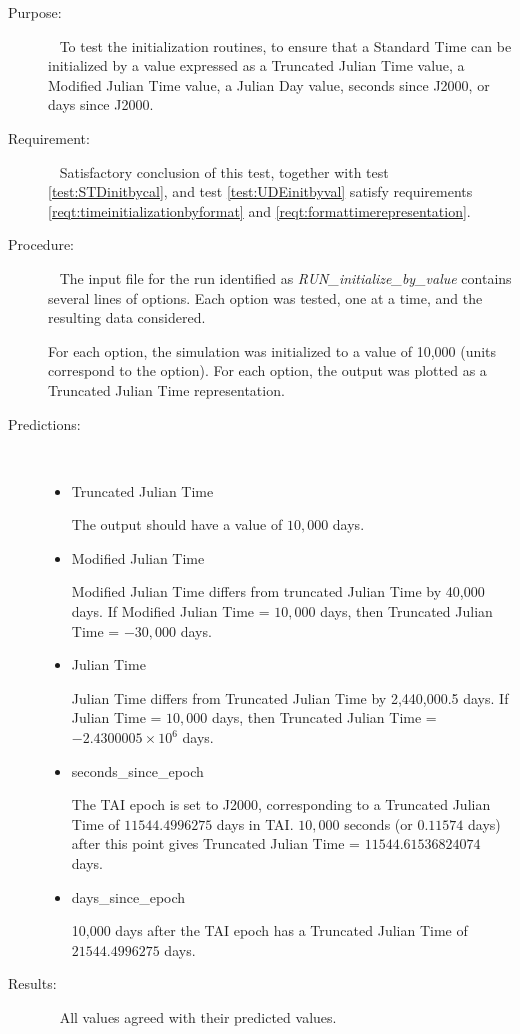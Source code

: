 \label{test:STDinitbyval}
\begin{description}
\item[Purpose:]\ \newline
To test the initialization routines, to ensure that a Standard Time can be initialized by a value expressed as a Truncated Julian Time value, a Modified Julian Time value, a Julian Day value, seconds since J2000, or days since J2000.

\item[Requirement:]\ \newline
Satisfactory conclusion of this test, together with test \ref{test:STDinitbycal}, and test \ref{test:UDEinitbyval} satisfy requirements \ref{reqt:timeinitializationbyformat} and \ref{reqt:formattimerepresentation}.

\item[Procedure:]\ \newline
The input file for the run identified as \textit{RUN\_initialize\_by\_value} contains several lines of options.  Each option was tested, one at a time, and the resulting data considered. 

For each option, the simulation was initialized to a value of 10,000 (units correspond to the option).  For each option, the output was plotted as a Truncated Julian Time representation.

\item[Predictions:]\ \newline
\begin{itemize}
	\item {Truncated Julian Time}
	
	The output should have a value of $10,000$ days.
	\item {Modified Julian Time}
	
	Modified Julian Time differs from truncated Julian Time by 40,000 days.  If Modified Julian Time = $10,000$ days, then Truncated Julian Time = $-30,000$ days.
	\item {Julian Time}
	
	Julian Time differs from Truncated Julian Time by 2,440,000.5 days.  If Julian Time = $10,000$ days, then Truncated Julian Time = $-2.4300005 \times 10^6 $ days.
	\item {seconds\_since\_epoch}
	
	The TAI epoch is set to J2000, corresponding to a Truncated Julian Time of $11544.4996275$ days in TAI.  $10,000$ seconds (or $0.11574$ days) after this point gives Truncated Julian Time = $11544.61536824074$ days.
	\item {days\_since\_epoch}
	
	10,000 days after the TAI epoch has a Truncated Julian Time of $21544.4996275$ days.
\end{itemize}

\item[Results:]\ \newline
  All values agreed with their predicted values.
\end{description}






